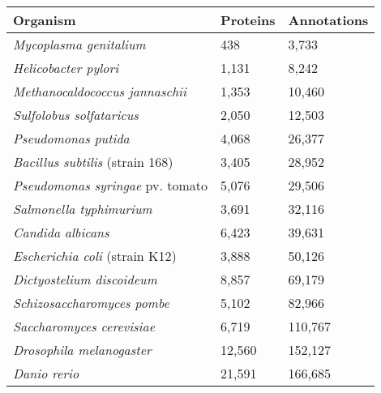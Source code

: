 \documentclass[12pt,a4paper]{report}
\begin{document}
\begin{table*}
\begin{minipage}[c][\textheight]{\textwidth}
\centering
\vspace{-3in}
\setlength{\tabcolsep}{5pt} %
\renewcommand{\arraystretch}{0.5} %
\begin{tabular}{lll}
\textbf{Organism}                                                                                       & \textbf{Proteins} & \textbf{Annotations} \\ \hline
\textit{Mycoplasma genitalium}                                  & 438      & 3,733       \\
\textit{Helicobacter pylori}                                               & 1,131    & 8,242       \\
\textit{Methanocaldococcus jannaschii}  & 1,353    & 10,460      \\
\textit{Sulfolobus solfataricus}                      & 2,050    & 12,503      \\
\textit{Pseudomonas putida}                        & 4,068    & 26,377      \\
\textit{Bacillus subtilis} (strain 168)                                                                 & 3,405    & 28,952      \\
\textit{Pseudomonas syringae} pv. tomato                                  & 5,076    & 29,506      \\
\textit{Salmonella typhimurium}                                   & 3,691    & 32,116      \\
\textit{Candida albicans}                                                & 6,423    & 39,631      \\
\textit{Escherichia coli} (strain K12)                                                                  & 3,888    & 50,126      \\
\textit{Dictyostelium discoideum}                                                                       & 8,857    & 69,179      \\
\textit{Schizosaccharomyces pombe}                                            & 5,102    & 82,966      \\
\textit{Saccharomyces cerevisiae}                                          & 6,719    & 110,767     \\
\textit{Drosophila melanogaster}                                                                        & 12,560   & 152,127     \\
\textit{Danio rerio}                                                                                    & 21,591   & 166,685     \\

\end{tabular}
\end{minipage}
\end{table*}
\end{document}
